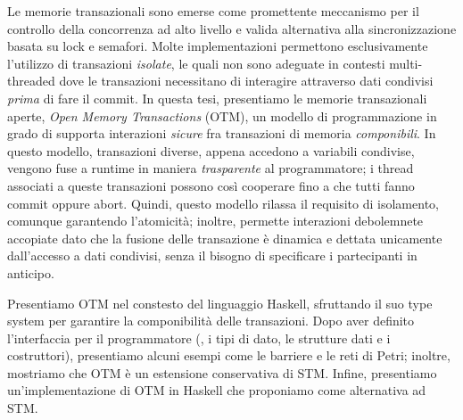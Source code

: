 
Le memorie transazionali sono emerse come promettente meccanismo per il controllo della concorrenza ad alto livello e valida alternativa alla sincronizzazione basata su lock e semafori.
Molte implementazioni permettono esclusivamente l'utilizzo di transazioni \emph{isolate}, le quali non sono adeguate in contesti multi-threaded dove le transazioni necessitano di interagire attraverso dati condivisi \emph{prima} di fare il commit.
In questa tesi, presentiamo le memorie transazionali aperte, \emph{Open Memory Transactions} (OTM), un modello di programmazione in grado di supporta interazioni \emph{sicure} fra transazioni di memoria \emph{componibili}. 
In questo modello, transazioni diverse, appena accedono a variabili condivise, vengono fuse a runtime in maniera \emph{trasparente} al programmatore; i thread associati a queste transazioni possono così cooperare fino a che tutti fanno commit oppure abort.
Quindi, questo modello rilassa il requisito di isolamento, comunque garantendo l'atomicità; inoltre, permette interazioni debolemnete accopiate dato che la fusione delle transazione è dinamica e dettata unicamente dall'accesso a dati condivisi, senza il bisogno di specificare i partecipanti in anticipo.

Presentiamo OTM nel constesto del linguaggio Haskell, sfruttando il suo type system per garantire la componibilità delle transazioni.
Dopo aver definito l'interfaccia per il programmatore (\ie, i tipi di dato, le strutture dati e i costruttori), presentiamo alcuni esempi come le barriere e le reti di Petri; inoltre, mostriamo che OTM è un estensione conservativa di STM.
Infine, presentiamo un'implementazione di OTM in Haskell che proponiamo come alternativa ad STM.
